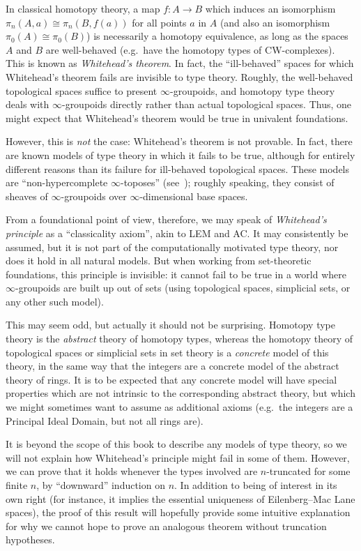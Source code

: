 In classical homotopy theory, a map $f:A\to B$ which induces an isomorphism $\pi_n(A,a) \cong \pi_n(B,f(a))$ for all points $a$ in $A$ (and also an isomorphism $\pi_0(A)\cong\pi_0(B)$) is necessarily a homotopy equivalence, as long as the spaces $A$ and $B$ are well-behaved (e.g.\ have the homotopy types of CW-complexes).
This is known as \emph{Whitehead's theorem}.
In fact, the ``ill-behaved'' spaces for which Whitehead's theorem fails are invisible to type theory.
Roughly, the well-behaved topological spaces suffice to present $\infty$-groupoids, and homotopy type theory deals with $\infty$-groupoids directly rather than actual topological spaces.
Thus, one might expect that Whitehead's theorem would be true in univalent foundations.

However, this is \emph{not} the case: Whitehead's theorem is not provable.
In fact, there are known models of type theory in which it fails to be true, although for entirely different reasons than its failure for ill-behaved topological spaces.
These models are ``non-hypercomplete $\infty$-toposes'' (see~\cite{lurie:higher-topoi}); roughly speaking, they consist of sheaves of $\infty$-groupoids over $\infty$-dimensional base spaces.

From a foundational point of view, therefore, we may speak of \emph{Whitehead's principle} as a ``classicality axiom'', akin to LEM and AC.
It may consistently be assumed, but it is not part of the computationally motivated type theory, nor does it hold in all natural models.
But when working from set-theoretic foundations, this principle is invisible: it cannot fail to be true in a world where $\infty$-groupoids are built up out of sets (using topological spaces, simplicial sets, or any other such model).

This may seem odd, but actually it should not be surprising.
Homotopy type theory is the \emph{abstract} theory of homotopy types, whereas the homotopy theory of topological spaces or simplicial sets in set theory is a \emph{concrete} model of this theory, in the same way that the integers are a concrete model of the abstract theory of rings.
It is to be expected that any concrete model will have special properties which are not intrinsic to the corresponding abstract theory, but which we might sometimes want to assume as additional axioms (e.g.\ the integers are a Principal Ideal Domain, but not all rings are).

It is beyond the scope of this book to describe any models of type theory, so we will not explain how Whitehead's principle might fail in some of them.
However, we can prove that it holds whenever the types involved are $n$-truncated for some finite $n$, by ``downward'' induction on $n$.
In addition to being of interest in its own right (for instance, it implies the essential uniqueness of Eilenberg--Mac Lane spaces), the proof of this result will hopefully provide some intuitive explanation for why we cannot hope to prove an analogous theorem without truncation hypotheses.

